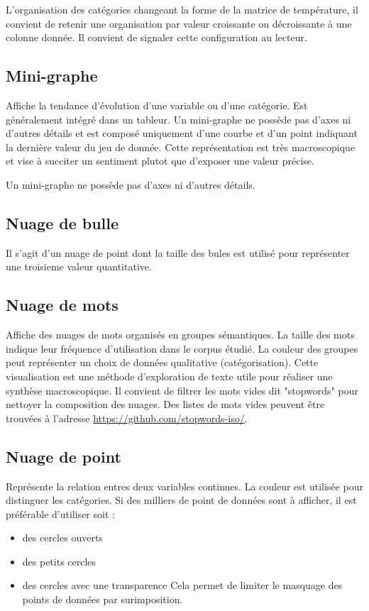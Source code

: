 \documentclass[a4paper,12pt]{article}
\begin{document}
\begin{multicols}{2}
L'organisation des catégories changeant la forme de la matrice de température, il convient de retenir une organisation par valeur croissante ou décroissante à une colonne donnée. Il convient de signaler cette configuration au lecteur. \autocite{wilkeVisualizingAmounts2019}
\subsection*{Mini-graphe}
\label{sec:org3e9a6f7}
Affiche la tendance d'évolution d'une variable ou d'une catégorie. Est généralement intégré dans un tableur. Un mini-graphe ne possède pas d'axes ni d'autres détails et est composé uniquement d'une courbe et d'un point indiquant la dernière valeur du jeu de donnée. \autocite{sosulskiGraphics2019} Cette représentation est très macroscopique et vise à succiter un sentiment plutot que d'exposer une valeur précise. \autocite{jonathanschwabishDistribution2021}

Un mini-graphe ne possède pas d'axes ni d'autres détails.
\subsection*{Nuage de bulle}
\label{sec:org7573f5b}
Il s'agit d'un nuage de point dont la taille des bules est utilisé pour représenter une troisieme valeur quantitative. \autocite{alansmithLexiqueVisuel}
\subsection*{Nuage de mots}
\label{sec:orgfff9023}
Affiche des nuages de mots organisés en groupes sémantiques. La taille des mots indique leur fréquence d'utilisation dans le corpus étudié. La couleur des groupes peut représenter un choix de données qualitative (catégorisation). \autocite{sosulskiGraphics2019} Cette visualisation est une méthode d'exploration de texte utile pour réaliser une synthèse macroscopique.
Il convient de filtrer les mots vides dit "stopwords" pour nettoyer la composition des nuages. \autocite{jonathanschwabishQualitative2021} Des listes de mots vides peuvent être trouvées à l'adresse \url{https://github.com/stopwords-iso/}.
\subsection*{Nuage de point}
\label{sec:orga1bc300}
Représente la relation entres deux variables continues. \autocite{alansmithLexiqueVisuel}
La couleur est utilisée pour distinguer les catégories.
Si des milliers de point de données sont à afficher, il est préférable d'utiliser soit :
\begin{itemize}
\item des cercles ouverts
\item des petits cercles
\item des cercles avec une transparence
Cela permet de limiter le masquage des points de données par surimposition. \autocite{andreaskrauseBestPracticesData2024}
\end{itemize}

\end{multicols}
\end{document}
